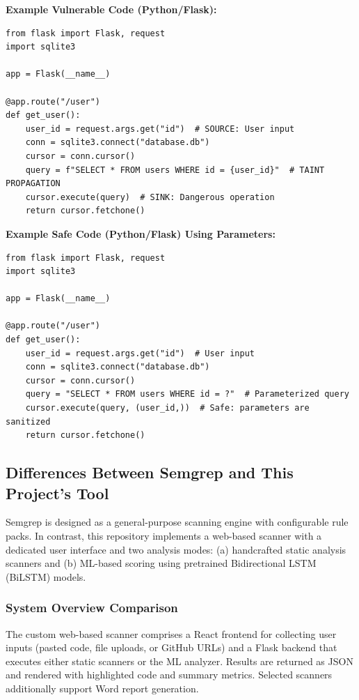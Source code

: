\textbf{Example Vulnerable Code (Python/Flask):}

\begin{lstlisting}[style=pycode]
from flask import Flask, request
import sqlite3

app = Flask(__name__)

@app.route("/user")
def get_user():
    user_id = request.args.get("id")  # SOURCE: User input
    conn = sqlite3.connect("database.db")
    cursor = conn.cursor()
    query = f"SELECT * FROM users WHERE id = {user_id}"  # TAINT PROPAGATION
    cursor.execute(query)  # SINK: Dangerous operation
    return cursor.fetchone()
\end{lstlisting}

\textbf{Example Safe Code (Python/Flask) Using Parameters:}

\begin{lstlisting}[style=pycode]
from flask import Flask, request
import sqlite3

app = Flask(__name__)

@app.route("/user")
def get_user():
    user_id = request.args.get("id")  # User input
    conn = sqlite3.connect("database.db")
    cursor = conn.cursor()
    query = "SELECT * FROM users WHERE id = ?"  # Parameterized query
    cursor.execute(query, (user_id,))  # Safe: parameters are sanitized
    return cursor.fetchone()
\end{lstlisting}

\subsection{Differences Between Semgrep and This Project's Tool}
\label{sec:semgrep_vs_tool}

Semgrep is designed as a general-purpose scanning engine with configurable rule packs. In contrast, this repository implements a web-based scanner with a dedicated user interface and two analysis modes: (a) handcrafted static analysis scanners and (b) ML-based scoring using pretrained Bidirectional LSTM (BiLSTM) models.

\subsubsection{System Overview Comparison}
\label{sec:semgrep_system_comparison}

The custom web-based scanner comprises a React frontend for collecting user inputs (pasted code, file uploads, or GitHub URLs) and a Flask backend that executes either static scanners or the ML analyzer. Results are returned as JSON and rendered with highlighted code and summary metrics. Selected scanners additionally support Word report generation.

